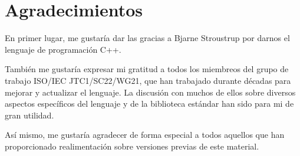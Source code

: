 \chapter*{Agradecimientos}

En primer lugar, me gustaría dar las gracias a Bjarne Stroustrup
por darnos el lenguaje de programación C++.

También me gustaría expresar mi gratitud a todos los miembreos del
grupo de trabajo ISO/IEC JTC1/SC22/WG21, que han trabajado durante
décadas para mejorar y actualizar el lenguaje.
La discusión con muchos de ellos sobre diversos aspectos específicos
del lenguaje y de la biblioteca estándar han sido para mi de gran utilidad.

Así mismo, me gustaría agradecer de forma especial a todos aquellos
que han proporcionado realimentación sobre versiones previas de este 
material.
